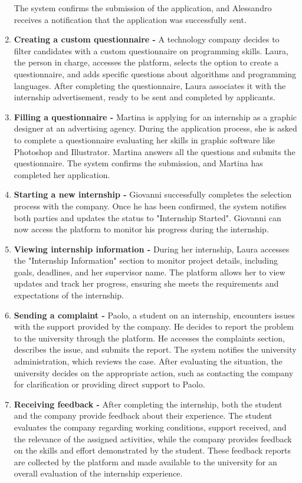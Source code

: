 \begin{enumerate}[label=\textbf{S\arabic* -}]
    The system confirms the submission of the application, and Alessandro receives a notification that the application was successfully sent.
    \item \textbf{Creating a custom questionnaire -}
    A technology company decides to filter candidates with a custom questionnaire on programming skills.
    Laura, the person in charge, accesses the platform, selects the option to create a questionnaire, and adds specific questions about algorithms and programming languages.
    After completing the questionnaire, Laura associates it with the internship advertisement, ready to be sent and completed by applicants.
    \item \textbf{Filling a questionnaire -}
    Martina is applying for an internship as a graphic designer at an advertising agency.
    During the application process, she is asked to complete a questionnaire evaluating her skills in graphic software like Photoshop and Illustrator.
    Martina answers all the questions and submits the questionnaire.
    The system confirms the submission, and Martina has completed her application.
    \item \textbf{Starting a new internship -}
    Giovanni successfully completes the selection process with the company.
    Once he has been confirmed, the system notifies both parties and updates the status to "Internship Started".
    Giovanni can now access the platform to monitor his progress during the internship.
    \item \textbf{Viewing internship information -}
    During her internship, Laura accesses the "Internship Information" section to monitor project details, including goals, deadlines, and her supervisor name.
    The platform allows her to view updates and track her progress, ensuring she meets the requirements and expectations of the internship.
    \item \textbf{Sending a complaint -}
    Paolo, a student on an internship, encounters issues with the support provided by the company.
    He decides to report the problem to the university through the platform.
    He accesses the complaints section, describes the issue, and submits the report.
    The system notifies the university administration, which reviews the case.
    After evaluating the situation, the university decides on the appropriate action, such as contacting the company for clarification or providing direct support to Paolo.
    \item \textbf{Receiving feedback -}
    After completing the internship, both the student and the company provide feedback about their experience.
    The student evaluates the company regarding working conditions, support received, and the relevance of the assigned activities, while the company provides feedback on the skills and effort demonstrated by the student.
    These feedback reports are collected by the platform and made available to the university for an overall evaluation of the internship experience.
\end{enumerate}

